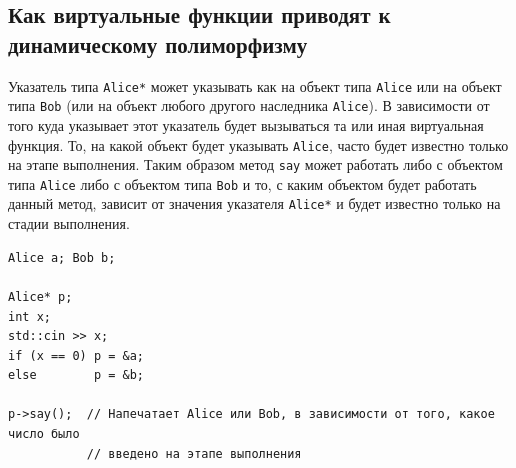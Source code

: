 \documentclass{article}
\begin{document}
\subsection*{Как виртуальные функции приводят к динамическому полиморфизму}
Указатель типа \texttt{Alice*} может указывать как на объект типа \texttt{Alice} или на объект типа \texttt{Bob} (или на объект любого другого наследника \texttt{Alice}). В зависимости от того куда указывает этот указатель будет вызываться та или иная виртуальная функция. То, на какой объект будет указывать \texttt{Alice}, часто будет известно только на этапе выполнения.
Таким образом метод \texttt{say} может работать либо с объектом типа \texttt{Alice} либо с объектом типа \texttt{Bob} и то, с каким объектом будет работать данный метод, зависит от значения указателя \texttt{Alice*} и будет известно только на стадии выполнения.
\begin{lstlisting}[style=csMiptCppBorderStyle]
Alice a; Bob b;

Alice* p;
int x;
std::cin >> x;
if (x == 0) p = &a;
else        p = &b;

p->say();  // Напечатает Alice или Bob, в зависимости от того, какое число было
           // введено на этапе выполнения
\end{lstlisting}

\newpage
\end{document}

